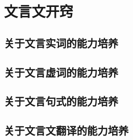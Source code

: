 \part{文言文开窍}
    \setcounter{chapter}{0}
        \chapter{关于文言实词的能力培养}
        
        
        
        
        
        
    \chapter{关于文言虚词的能力培养}
        
        
        
    \chapter{关于文言句式的能力培养}
        
        
    \chapter{关于文言文翻译的能力培养}
        
        
